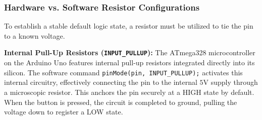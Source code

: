\documentclass[journal,12pt,onecolumn]{IEEEtran}
\begin{document}
		\subsubsection{Hardware vs. Software Resistor Configurations}
		To establish a stable default logic state, a resistor must be utilized to tie the pin to a known voltage. 
		
		
		\textbf{Internal Pull-Up Resistors (\texttt{INPUT\_PULLUP}):} The ATmega328 microcontroller on the Arduino Uno features internal pull-up resistors integrated directly into its silicon. The software command \texttt{pinMode(pin, INPUT\_PULLUP);} activates this internal circuitry, effectively connecting the pin to the internal $5\text{V}$ supply through a microscopic resistor. This anchors the pin securely at a HIGH state by default. When the button is pressed, the circuit is completed to ground, pulling the voltage down to register a LOW state. 
	
\end{document}
